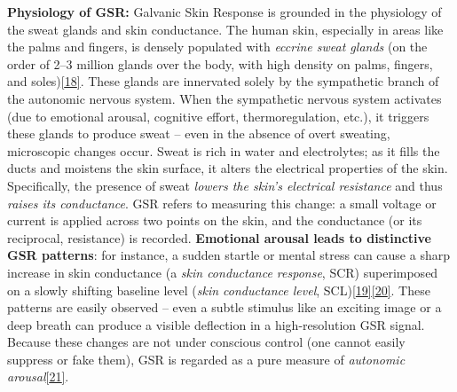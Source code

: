 \documentclass[12pt,a4paper]{article}
\begin{document}
\textbf{Physiology of GSR:} Galvanic Skin Response is grounded in the physiology of the sweat glands and skin conductance. The human skin, especially in areas like the palms and fingers, is densely populated with \emph{eccrine sweat glands} (on the order of 2--3 million glands over the body, with high density on palms, fingers, and soles)\href{https://imotions.com/blog/learning/research-fundamentals/galvanic-skin-response/\#:~:text=Our\%20body\%20has\%20about\%20three,the\%20sole\%20of\%20the\%20feet}{{[}18{]}}. These glands are innervated solely by the sympathetic branch of the autonomic nervous system. When the sympathetic nervous system activates (due to emotional arousal, cognitive effort, thermoregulation, etc.), it triggers these glands to produce sweat -- even in the absence of overt sweating, microscopic changes occur. Sweat is rich in water and electrolytes; as it fills the ducts and moistens the skin surface, it alters the electrical properties of the skin. Specifically, the presence of sweat \emph{lowers the skin's electrical resistance} and thus \emph{raises its conductance}. GSR refers to measuring this change: a small voltage or current is applied across two points on the skin, and the conductance (or its reciprocal, resistance) is recorded. \textbf{Emotional arousal leads to distinctive GSR patterns}: for instance, a sudden startle or mental stress can cause a sharp increase in skin conductance (a \emph{skin conductance response}, SCR) superimposed on a slowly shifting baseline level (\emph{skin conductance level}, SCL)\href{https://imotions.com/blog/learning/research-fundamentals/galvanic-skin-response/\#:~:text=Galvanic\%20Skin\%20Response\%20originates\%20from,that\%20can\%20be\%20quantified\%20statistically}{{[}19{]}}\href{https://imotions.com/blog/learning/research-fundamentals/galvanic-skin-response/\#:~:text=in\%20the\%20skin,that\%20can\%20be\%20quantified\%20statistically}{{[}20{]}}. These patterns are easily observed -- even a subtle stimulus like an exciting image or a deep breath can produce a visible deflection in a high-resolution GSR signal. Because these changes are not under conscious control (one cannot easily suppress or fake them), GSR is regarded as a pure measure of \emph{autonomic arousal}\href{https://imotions.com/blog/learning/research-fundamentals/galvanic-skin-response/\#:~:text=With\%20GSR\%2C\%20you\%20can\%20tap,psychological\%20processes\%20of\%20a\%20person}{{[}21{]}}.
\end{document}
